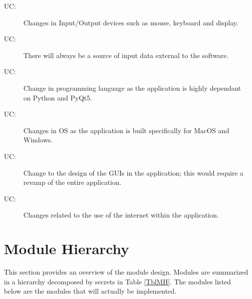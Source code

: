 \documentclass[12pt, titlepage]{article}
\newcounter{ucnum}
\newcommand{\uctheucnum}{UC\theucnum}
\begin{document}
\begin{description}
\item[ \uctheucnum \label{ucIO}:] Changes in Input/Output devices such as mouse, keyboard and display.
\item[ \uctheucnum \label{ucInput}:] There will always be
  a source of input data external to the software.
\item[ \uctheucnum \label{ucPL}:] Change in programming language as the application is highly dependant on Python and PyQt5.
\item[ \uctheucnum \label{ucOS}:] Changes in OS as the application is built specifically for MacOS and Windows.
\item[ \uctheucnum \label{ucGUI}:] Change to the design of the GUIs in the application; this would require a revamp of the entire application.
\item[ \uctheucnum \label{ucI}:] Changes related to the use of the internet within the application.
\end{description}

\section{Module Hierarchy} \label{SecMH}

This section provides an overview of the module design. Modules are summarized
in a hierarchy decomposed by secrets in Table \ref{TblMH}. The modules listed
below are the modules that will actually be implemented.
\end{document}
